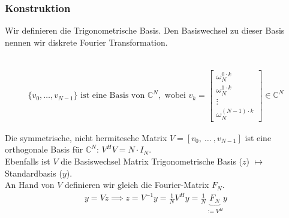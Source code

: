 \subsubsection{Konstruktion}

Wir definieren die Trigonometrische Basis. Den Basiswechsel zu dieser Basis nennen wir diskrete Fourier Transformation.

\\
\begin{align*}
    \{v_0, \ldots, v_{N-1}\} \text{ ist eine Basis von } \mathbb{C}^N, \text{ wobei } v_k =
    \begin{bmatrix}
        \omega_N^{0\cdot k} \\ \omega_N^{1\cdot k} \\ \vdots \\ \omega_N^{(N-1)\cdot k}
    \end{bmatrix}
    \in \mathbb{C}^N
\end{align*}

Die symmetrische, nicht hermitesche Matrix $V = [v_0,\ \ldots\ , v_{N-1}]$ ist eine orthogonale Basis für $\mathbb{C}^N$: $V^HV = N\cdot I_N$.\\
Ebenfalls ist $V$ die Basiswechsel Matrix Trigonometrische Basis ($z$) $\mapsto$ Standardbasis ($y$).\\
An Hand von $V$ definieren wir gleich die Fourier-Matrix $F_N$.
\begin{align*}
    y = Vz \implies z = V^{-1}y = \frac{1}{N}V^Hy = \frac{1}{N}\underbrace{F_N}_{:= V^H} y
\end{align*}

